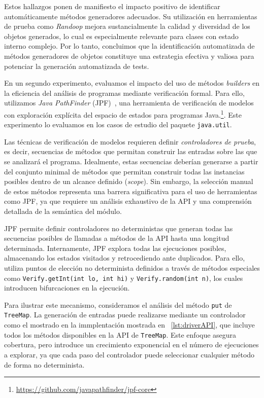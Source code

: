 Estos hallazgos ponen de manifiesto el impacto positivo de identificar automáticamente métodos 
generadores adecuados. Su utilización en herramientas de prueba como \emph{Randoop} mejora sustancialmente 
la calidad y diversidad de los objetos generados, lo cual es especialmente relevante para clases con 
estado interno complejo. Por lo tanto, concluimos que la identificación automatizada de métodos generadores de objetos 
constituye una estrategia efectiva y valiosa para potenciar la generación automatizada de tests.


\vspace{10pt}
En un segundo experimento, evaluamos el impacto del uso de métodos \emph{builders} en la eficiencia 
del análisis de programas mediante verificación formal. Para ello, utilizamos \emph{Java PathFinder} 
(JPF)~\cite{Visser:2005}, una herramienta de verificación de modelos con exploración explícita del 
espacio de estados para programas Java.\footnote{\url{https://github.com/javapathfinder/jpf-core}}. 
Este experimento lo evaluamos en los casos de estudio del paquete \texttt{java.util}.

Las técnicas de verificación de modelos requieren definir \emph{controladores de prueba}, es decir, 
secuencias de métodos que permitan construir las entradas sobre las que se analizará el programa. 
Idealmente, estas secuencias deberían generarse a partir del conjunto minimal de métodos que permitan 
construir todas las instancias posibles dentro de un alcance definido (\emph{scope}). Sin embargo, 
la selección manual de estos métodos representa una barrera significativa para el uso de herramientas 
como JPF, ya que requiere un análisis exhaustivo de la API y una comprensión detallada de la 
semántica del módulo.

JPF permite definir controladores no deterministas que generan todas las secuencias posibles de 
llamadas a métodos de la API hasta una longitud determinada. Internamente, JPF explora todas las 
ejecuciones posibles, almacenando los estados visitados y retrocediendo ante duplicados. Para ello, 
utiliza puntos de elección no determinista definidos a través de métodos especiales como 
\verb|Verify.getInt(int lo, int hi)| y \verb|Verify.random(int n)|, los cuales introducen bifurcaciones 
en la ejecución.

Para ilustrar este mecanismo, consideramos el análisis del método \texttt{put} de \texttt{TreeMap}. 
La generación de entradas puede realizarse mediante un controlador como el mostrado en la immplentación mostrada en ~\ref{lst:driverAPI}, que incluye todos los métodos disponibles en la API de \texttt{TreeMap}. 
Este enfoque asegura cobertura, pero introduce un crecimiento exponencial en el número de ejecuciones 
a explorar, ya que cada paso del controlador puede seleccionar cualquier método de forma no 
determinista.

